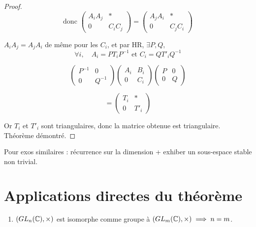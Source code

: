 \begin{proof}
\[ \text{donc } \begin{pmatrix} A_i A_j & * \\ 0 & C_i C_j \end{pmatrix} = \begin{pmatrix} A_j A_i & * \\ 0 & C_j C_i \end{pmatrix} \]

$A_i A_j = A_j A_i$ de même pour les $C_i$, et par HR, $\exists P, Q$,
\[ \forall i, \quad A_i = P T_i P^{-1} \text{ et } C_i = Q T'_i Q^{-1} \]

\[
    \begin{pmatrix} P^{-1} & 0 \\ 0 & Q^{-1} \end{pmatrix}
    \begin{pmatrix} A_i & B_i \\ 0 & C_i \end{pmatrix}
    \begin{pmatrix} P & 0 \\ 0 & Q \end{pmatrix}
\]

\[
    = \begin{pmatrix} T_i & * \\ 0 & T'_i \end{pmatrix}
\]

Or $T_i$ et $T'_i$ sont triangulaires, donc la matrice obtenue est triangulaire.
Théorème démontré.
\end{proof}


\begin{tcolorbox}[colframe=ideabar, colback=white, title=Idée à retenir]
    Pour exos similaires : récurrence sur la dimension + exhiber un sous-espace stable non trivial.
\end{tcolorbox}

\section*{Applications directes du théorème}

\begin{enumerate}
    \item $(GL_n(\mathbb{C}), \times)$ est isomorphe comme groupe à $(GL_m(\mathbb{C}), \times) \implies n=m$.
\end{enumerate}

